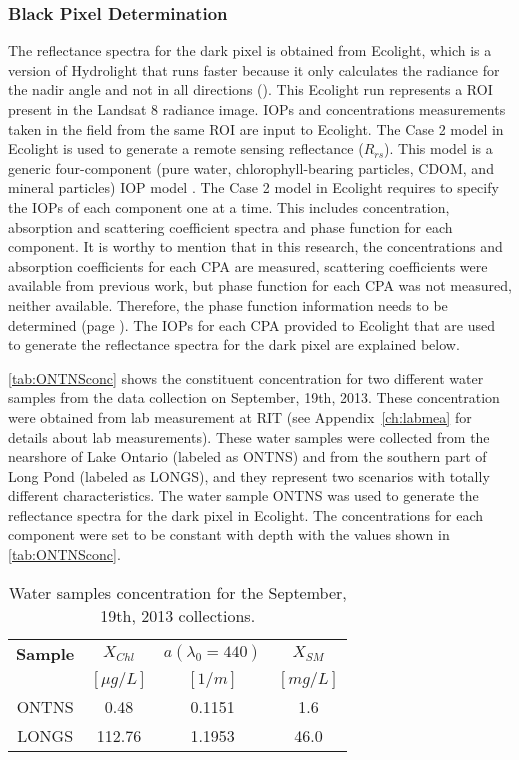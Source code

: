 \subsubsection{Black Pixel Determination}
\label{subsubsec:blackpixel}
The reflectance spectra for the dark pixel is obtained from Ecolight, which is a version of Hydrolight that runs faster because it only calculates the radiance for the nadir angle and not in all directions (\cite{MobleyHEtech}). This Ecolight run represents a ROI present in the Landsat 8 radiance image. IOPs and concentrations measurements taken in the field from the same ROI are input to Ecolight. The Case 2 model in Ecolight is used to generate a remote sensing reflectance ($R_{rs}$). This model is a generic four-component (pure water, chlorophyll-bearing particles, CDOM, and mineral particles) IOP model \cite{MobleyHEtech}. The Case 2 model in Ecolight requires to specify the IOPs of each component one at a time. This includes concentration, absorption and scattering coefficient spectra and phase function for each component. It is worthy to mention that in this research, the concentrations and absorption coefficients for each CPA are measured, scattering coefficients were available from previous work, but phase function for each CPA was not measured, neither available. Therefore, the phase function information needs to be determined (page \pageref{pag:phasefn}). The IOPs for each CPA provided to Ecolight that are used to generate the reflectance spectra for the dark pixel are explained below.

\autoref{tab:ONTNSconc} shows the constituent concentration for two different water samples from the data collection on September, 19th, 2013. These concentration were obtained from lab measurement at RIT (see Appendix~\ref{ch:labmea} for details about lab measurements). These water samples were collected from the nearshore of Lake Ontario (labeled as ONTNS) and from the southern part of Long Pond (labeled as LONGS), and they represent two scenarios with totally different characteristics. The water sample ONTNS was used to generate the reflectance spectra for the dark pixel in Ecolight. The concentrations for each component were set to be constant with depth with the values shown in \autoref{tab:ONTNSconc}. 
\vspace{.5cm}
\begin{table}[!ht]
\caption{ Water samples concentration for the September, 19th, 2013 collections. \label{tab:ONTNSconc} } 
\centering
\begin{tabular}{c|c|c|c} 
 \bfseries{Sample} & \bfseries{$X_{Chl}$} & \bfseries{$a(\lambda_0=440)$}& \bfseries{$X_{SM}$}\\
 & $[\mu g/L]$ & $[1/m]$ & $[mg/L]$ \\ \hline \hline
ONTNS & 0.48 & 0.1151 & 1.6\\ 
LONGS & 112.76 & 1.1953 & 46.0\\ 
 \end{tabular}
\end{table}

